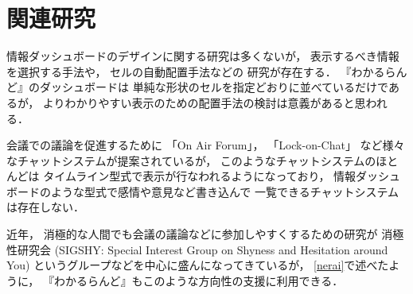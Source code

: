 \section{関連研究}

情報ダッシュボードのデザイン\cite{few}に関する研究は多くないが，
表示するべき情報を選択する手法\cite{Jones:2015:ECI:2800835.2800963}や，
セルの自動配置手法\cite{Hertzog:2015:BSP:2678025.2701383}などの
研究が存在する．
『わかるらんど』のダッシュボードは
単純な形状のセルを指定どおりに並べているだけであるが，
よりわかりやすい表示のための配置手法の検討は意義があると思われる．

会議での議論を促進するために
「On Air Forum」\cite{nishida2011}，
「Lock-on-Chat」\cite{nishida2006}
など様々なチャットシステムが提案されているが，
このようなチャットシステムのほとんどは
タイムライン型式で表示が行なわれるようになっており，
情報ダッシュボードのような型式で感情や意見など書き込んで
一覧できるチャットシステムは存在しない．

近年，
消極的な人間でも会議の議論などに参加しやすくするための研究が
消極性研究会 (SIGSHY: Special Interest Group on Shyness and Hesitation around You)
というグループなどを中心に盛んになってきているが\cite{kurihara2016}\cite{nishida2011}，
\ref{nerai}で述べたように，
『わかるらんど』もこのような方向性の支援に利用できる．

% 
% 
% 
